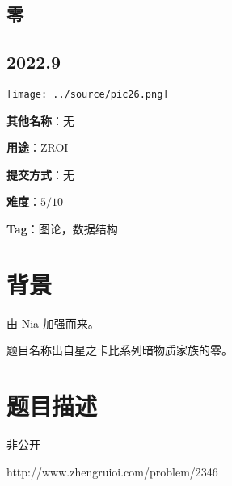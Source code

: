 \documentclass[a4paper,10pt]{article}
\begin{document}
\vspace*{\fill}
\begin{center}

\section{零}

\subsection*{2022.9}

\vspace{10pt}

\texttt{[image: ../source/pic26.png]}

\vspace{10pt}

\textbf{其他名称}：无

\vspace{10pt}

\textbf{用途}：ZROI

\vspace{10pt}

\textbf{提交方式}：无

\vspace{10pt}

\textbf{难度}：$5/10$

\vspace{10pt}

\textbf{Tag}：图论，数据结构

\end{center}
\vspace*{\fill}

\newpage

\section*{背景}

由 Nia 加强而来。

题目名称出自星之卡比系列暗物质家族的零。

\section*{题目描述}

非公开

http://www.zhengruioi.com/problem/2346

\newpage
\end{document}
